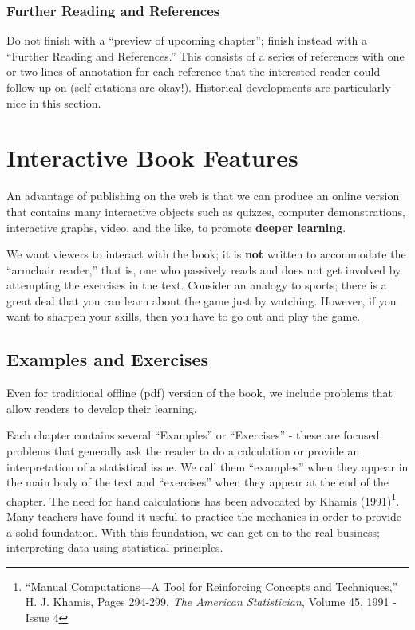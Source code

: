 \documentclass[]{book}
\let\rmarkdownfootnote\footnote%
\def\footnote{\protect\rmarkdownfootnote}
\theoremstyle{definition}
\theoremstyle{definition}
\theoremstyle{definition}
\theoremstyle{remark}
\begin{document}
\subsection{Further Reading and
References}\label{further-reading-and-references}

Do not finish with a ``preview of upcoming chapter''; finish instead
with a ``Further Reading and References.'' This consists of a series of
references with one or two lines of annotation for each reference that
the interested reader could follow up on (self-citations are okay!).
Historical developments are particularly nice in this section.

\chapter{Interactive Book Features}\label{S:Interactive}

An advantage of publishing on the web is that we can produce an online
version that contains many interactive objects such as quizzes, computer
demonstrations, interactive graphs, video, and the like, to promote
\textbf{deeper learning}.

We want viewers to interact with the book; it is \textbf{not} written to
accommodate the ``armchair reader,'' that is, one who passively reads
and does not get involved by attempting the exercises in the text.
Consider an analogy to sports; there is a great deal that you can learn
about the game just by watching. However, if you want to sharpen your
skills, then you have to go out and play the game.

\section{Examples and Exercises}\label{examples-and-exercises}

Even for traditional offline (pdf) version of the book, we include
problems that allow readers to develop their learning.

Each chapter contains several ``Examples'' or ``Exercises'' - these are
focused problems that generally ask the reader to do a calculation or
provide an interpretation of a statistical issue. We call them
``examples'' when they appear in the main body of the text and
``exercises'' when they appear at the end of the chapter. The need for
hand calculations has been advocated by Khamis (1991)\footnote{``Manual
  Computations---A Tool for Reinforcing Concepts and Techniques,'' H. J.
  Khamis, Pages 294-299, \emph{The American Statistician}, Volume 45,
  1991 - Issue 4}. Many teachers have found it useful to practice the
mechanics in order to provide a solid foundation. With this foundation,
we can get on to the real business; interpreting data using statistical
principles.
\end{document}
